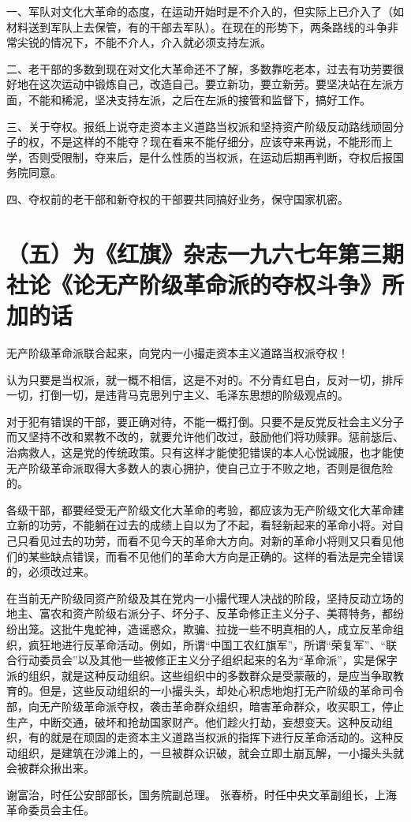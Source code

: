 一、军队对文化大革命的态度，在运动开始时是不介入的，但实际上已介入了（如材料送到军队上去保管，有的干部去军队）。在现在的形势下，两条路线的斗争非常尖锐的情况下，不能不介人，介入就必须支持左派。

二、老干部的多数到现在对文化大革命还不了解，多数靠吃老本，过去有功劳要很好地在这次运动中锻炼自己，改造自己。要立新功，要立新劳。要坚决站在左派方面，不能和稀泥，坚决支持左派，之后在左派的接管和监督下，搞好工作。

三、关于夺权。报纸上说夺走资本主义道路当权派和坚持资产阶级反动路线顽固分子的权，不是这样的不能夺？现在看来不能仔细分，应该夺来再说，不能形而上学，否则受限制，夺来后，是什么性质的当权派，在运动后期再判断，夺权后报国务院同意。

四、夺权前的老干部和新夺权的干部要共同搞好业务，保守国家机密。

\date{一九六七年一月三十日}
\section*{（五）为《红旗》杂志一九六七年第三期社论《论无产阶级革命派的夺权斗争》所加的话}

无产阶级革命派联合起来，向党内一小撮走资本主义道路当权派夺权！

认为只要是当权派，就一概不相信，这是不对的。不分青红皂白，反对一切，排斥一切，打倒一切，是违背马克思列宁主义、毛泽东思想的阶级观点的。

对于犯有错误的干部，要正确对待，不能一概打倒。只要不是反党反社会主义分子而又坚持不改和累教不改的，就要允许他们改过，鼓励他们将功赎罪。惩前毖后、治病救人，这是党的传统政策。只有这样才能使犯错误的本人心悦诚服，也才能使无产阶级革命派取得大多数人的衷心拥护，使自己立于不败之地，否则是很危险的。

各级干部，都要经受无产阶级文化大革命的考验，都应该为无产阶级文化大革命建立新的功劳，不能躺在过去的成绩上自以为了不起，看轻新起来的革命小将。对自己只看见过去的功劳，而看不见今天的革命大方向。对新的革命小将则又只看见他们的某些缺点错误，而看不见他们的革命大方向是正确的。这样的看法是完全错误的，必须改过来。

在当前无产阶级同资产阶级及其在党内一小撮代理人决战的阶段，坚持反动立场的地主、富农和资产阶级右派分子、坏分子、反革命修正主义分子、美蒋特务，都纷纷出笼。这批牛鬼蛇神，造谣惑众，欺骗、拉拢一些不明真相的人，成立反革命组织，疯狂地进行反革命活动。例如，所谓“中国工农红旗军”，所谓“荣复军”、“联合行动委员会”以及其他一些被修正主义分子组织起来的名为“革命派”，实是保字派的组织，就是这种反动组织。这些组织中的多数群众是受蒙蔽的，是应当争取教育的。但是，这些反动组织的一小撮头头，却处心积虑地炮打无产阶级的革命司令部，向无产阶级革命派夺权，袭击革命群众组织，暗害革命群众，收买职工，停止生产，中断交通，破坏和抢劫国家财产。他们趁火打劫，妄想变天。这种反动组织，有的就是在顽固的走资本主义道路当权派的指挥下进行反革命活动的。这种反动组织，是建筑在沙滩上的，一旦被群众识破，就会立即土崩瓦解，一小撮头头就会被群众揪出来。

\begin{maonote}
谢富治，时任公安部部长，国务院副总理。
张春桥，时任中央文革副组长，上海革命委员会主任。
\end{maonote}
